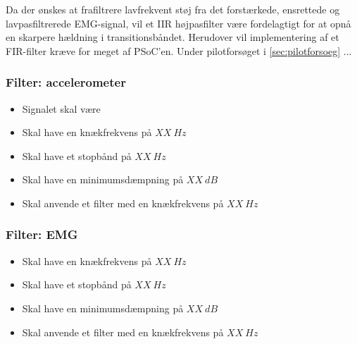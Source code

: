 Da der ønskes at frafiltrere lavfrekvent støj fra det forstærkede, ensrettede og lavpasfiltrerede EMG-signal, vil et IIR højpasfilter være fordelagtigt for at opnå en skarpere hældning i transitionsbåndet. Herudover vil implementering af et FIR-filter kræve for meget af PSoC'en. Under pilotforsøget i \autoref{sec:pilotforsoeg} ... 

\subsubsection{Filter: accelerometer}
\begin{itemize}
\item Signalet skal være 
\item Skal have en knækfrekvens på $XX~Hz$
\item Skal have et stopbånd på $XX~Hz$
\item Skal have en minimumsdæmpning på $XX~dB$
\item Skal anvende et filter med en knækfrekvens på $XX~Hz$
\end{itemize}

\subsubsection{Filter: EMG}
\begin{itemize}
\item Skal have en knækfrekvens på $XX~Hz$
\item Skal have et stopbånd på $XX~Hz$
\item Skal have en minimumsdæmpning på $XX~dB$
\item Skal anvende et filter med en knækfrekvens på $XX~Hz$
\end{itemize}